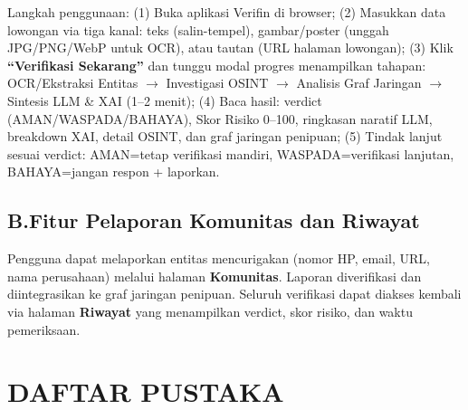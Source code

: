 \documentclass[12pt,a4paper]{article}
\begin{document}
Langkah penggunaan: (1) Buka aplikasi Verifin di browser; (2) Masukkan data lowongan via tiga kanal: teks (salin-tempel), gambar/poster (unggah JPG/PNG/WebP untuk OCR), atau tautan (URL halaman lowongan); (3) Klik \textbf{``Verifikasi Sekarang''} dan tunggu modal progres menampilkan tahapan: OCR/Ekstraksi Entitas $\to$ Investigasi OSINT $\to$ Analisis Graf Jaringan $\to$ Sintesis LLM \& XAI (1--2 menit); (4) Baca hasil: verdict (AMAN/WASPADA/BAHAYA), Skor Risiko 0--100, ringkasan naratif LLM, breakdown XAI, detail OSINT, dan graf jaringan penipuan; (5) Tindak lanjut sesuai verdict: AMAN=tetap verifikasi mandiri, WASPADA=verifikasi lanjutan, BAHAYA=jangan respon + laporkan.

\subsection*{B.\quad Fitur Pelaporan Komunitas dan Riwayat}

Pengguna dapat melaporkan entitas mencurigakan (nomor HP, email, URL, nama perusahaan) melalui halaman \textbf{Komunitas}. Laporan diverifikasi dan diintegrasikan ke graf jaringan penipuan. Seluruh verifikasi dapat diakses kembali via halaman \textbf{Riwayat} yang menampilkan verdict, skor risiko, dan waktu pemeriksaan.

\section*{DAFTAR PUSTAKA}
\end{document}
